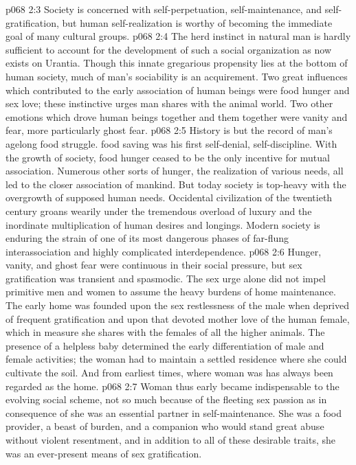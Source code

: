 \vs p068 2:3 Society is concerned with self\hyp{}perpetuation, self\hyp{}maintenance, and self\hyp{}gratification, but human self\hyp{}realization is worthy of becoming the immediate goal of many cultural groups.
\vs p068 2:4 The herd instinct in natural man is hardly sufficient to account for the development of such a social organization as now exists on Urantia. Though this innate gregarious propensity lies at the bottom of human society, much of man’s sociability is an acquirement. Two great influences which contributed to the early association of human beings were food hunger and sex love; these instinctive urges man shares with the animal world. Two other emotions which drove human beings together and  them together were vanity and fear, more particularly ghost fear.
\pc \vs p068 2:5 History is but the record of man’s agelong food struggle.  food saving was his first self\hyp{}denial, self\hyp{}discipline. With the growth of society, food hunger ceased to be the only incentive for mutual association. Numerous other sorts of hunger, the realization of various needs, all led to the closer association of mankind. But today society is top\hyp{}heavy with the overgrowth of supposed human needs. Occidental civilization of the twentieth century groans wearily under the tremendous overload of luxury and the inordinate multiplication of human desires and longings. Modern society is enduring the strain of one of its most dangerous phases of far\hyp{}flung interassociation and highly complicated interdependence.
\vs p068 2:6 Hunger, vanity, and ghost fear were continuous in their social pressure, but sex gratification was transient and spasmodic. The sex urge alone did not impel primitive men and women to assume the heavy burdens of home maintenance. The early home was founded upon the sex restlessness of the male when deprived of frequent gratification and upon that devoted mother love of the human female, which in measure she shares with the females of all the higher animals. The presence of a helpless baby determined the early differentiation of male and female activities; the woman had to maintain a settled residence where she could cultivate the soil. And from earliest times, where woman was has always been regarded as the home.
\vs p068 2:7 Woman thus early became indispensable to the evolving social scheme, not so much because of the fleeting sex passion as in consequence of  she was an essential partner in self\hyp{}maintenance. She was a food provider, a beast of burden, and a companion who would stand great abuse without violent resentment, and in addition to all of these desirable traits, she was an ever\hyp{}present means of sex gratification.
